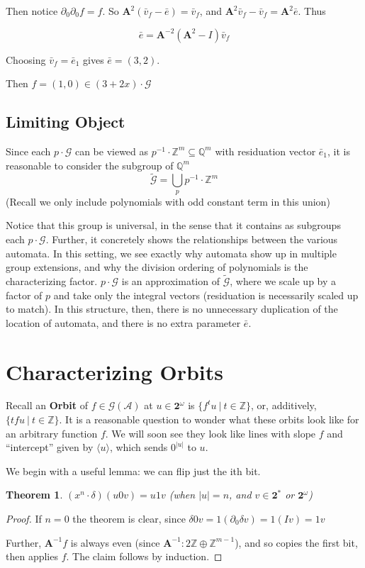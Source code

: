 \documentclass{article}
\newcommand{\A}{\mathcal{A}}
\newcommand{\G}{\mathcal{G}}
\newcommand{\Z}{\mathbb{Z}}
\newcommand{\Q}{\mathbb{Q}}
\newcommand{\2}{\textbf{2}}
\newcommand{\Am}{\textbf{A}}
\newcommand{\del}{\partial}
\newcommand{\vv}{\bar{v}}
\newcommand{\e}{\bar{e}}
\newtheorem{thm}{Theorem}
\theoremstyle{definition}
\begin{document}
Then notice $\del_0 \del_0 f = f$.
So $\Am^2 (\vv_f - \e) = \vv_f$, and
$\Am^2 \vv_f - \vv_f = \Am^2 \e$. Thus

\[ \e = \Am^{-2} (\Am^2 - I) \vv_f \]

Choosing $\vv_f = \e_1$ gives $\e = (3,2)$.

Then $f = (1,0) \in (3+2x) \cdot \G$

\subsection{Limiting Object}
Since each $p \cdot \G$ can be viewed as $p^{-1} \cdot \Z^m \subseteq \Q^m$
with residuation vector $\e_1$,
it is reasonable to consider the subgroup of $\Q^m$
\[ 
  \widetilde{\G} = \bigcup_p p^{-1} \cdot \Z^m 
\]
(Recall we only include polynomials with odd constant term in this union)

Notice that this group is universal, in the sense that it contains as
subgroups each $p \cdot \G$. Further, it concretely shows the relationships
between the various automata. In this setting, we see exactly why automata 
show up in multiple group extensions, and why the division ordering of 
polynomials is the characterizing factor. $p \cdot \G$ is an approximation
of $\widetilde{\G}$, where we scale up by a factor of $p$ and take only
the integral vectors (residuation is necessarily scaled up to match). 
In this structure, then, there is no unnecessary duplication of the location
of automata, and there is no extra parameter $\e$.

\newpage
\section{Characterizing Orbits}

Recall an \textbf{Orbit} of $f \in \G(\A)$ at $u \in \2^{\omega}$
is $\{ f^t u~|~t \in \Z \}$, or, additively, $\{ tf u~|~t \in \Z \}$.
It is a reasonable question to wonder what these orbits look like
for an arbitrary function $f$. We will soon see they look like lines
with slope $f$ and ``intercept'' given by $\langle u \rangle$, which sends
$0^{|u|}$ to $u$.

We begin with a useful lemma: we can flip just the ith bit.

\begin{thm}
  $(x^n \cdot \delta) (u0v) = u1v$ 
  (when $|u| = n$, and $v \in \2^*$ or $\2^\omega$)
\end{thm}

\begin{proof}
  If $n=0$ the theorem is clear, since 
  $\delta 0v = 1 (\del_0 \delta v) = 1 (I v) = 1v$

  Further, $\Am^{-1}f$ is always even 
  (since $\Am^{-1}:2\Z \oplus \Z^{m-1}$), 
  and so copies the first bit, then applies $f$. 
  The claim follows by induction.

\end{proof}
\end{document}
